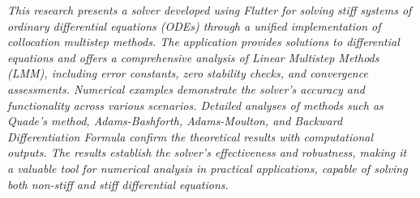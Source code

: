 \textit{This research presents a solver developed using Flutter for solving stiff systems of ordinary differential equations (ODEs) through a unified implementation of collocation multistep methods. The application provides solutions to differential equations and offers a comprehensive analysis of Linear Multistep Methods (LMM), including error constants, zero stability checks, and convergence assessments. Numerical examples demonstrate the solver's accuracy and functionality across various scenarios. Detailed analyses of methods such as Quade’s method, Adams-Bashforth, Adams-Moulton, and Backward Differentiation Formula confirm the theoretical results with computational outputs. The results establish the solver's effectiveness and robustness, making it a valuable tool for numerical analysis in practical applications, capable of solving both non-stiff and stiff differential equations.}
